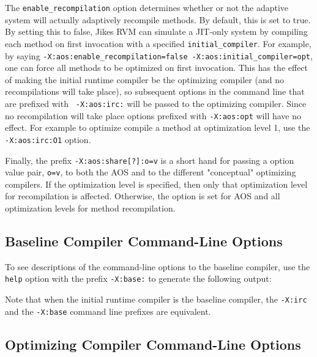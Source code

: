 The {\tt enable\_recompilation} option determines whether or not the
adaptive system will actually adaptively recompile methods.  By
default, this is set to true. By setting this to false, Jikes RVM can
simulate a JIT-only system by compiling each method on first
invocation with a specified {\tt initial\_compiler}. For example, 
by saying {\tt -X:aos:enable\_recompilation=false
-X:aos:initial\_compiler=opt}, one can force all methods to be
optimized on first invocation. 
This has the effect of making the initial runtime compiler
be the optimizing compiler (and no recompilations will take place), so
subsequent options in the command line that are prefixed with {\tt
-X:aos:irc:} will be passed to the optimizing compiler. Since no
recompilation will take place options prefixed with {\tt -X:aos:opt}
will have no effect.  For example to optimize compile a method at
optimization level 1, use the {\tt -X:aos:irc:O1} option. 

Finally, the prefix {\tt -X:aos:share[?]:o=v} is a short hand for
passing a option value pair, {\tt o=v}, to both the AOS and to the
different "conceptual" optimizing compilers.  If the optimization
level is specified, then only that optimization level for
recompilation is affected.  Otherwise, the option is set for AOS and
all optimization levels for method recompilation.

\subsection{Baseline Compiler Command-Line Options}
\label{section:nonadaptive:baseline:options}

To see descriptions of the command-line options to the baseline
compiler, use the {\tt help} option with the prefix {\tt -X:base:} 
to generate the following output:

\T \begin{small}

\T \end{small}
 
Note that when the initial runtime compiler is the baseline compiler, 
the {\tt -X:irc} and the {\tt -X:base} command line prefixes are equivalent.

\subsection{Optimizing Compiler Command-Line Options}
\label{section:nonadaptive:optimizing:options}


